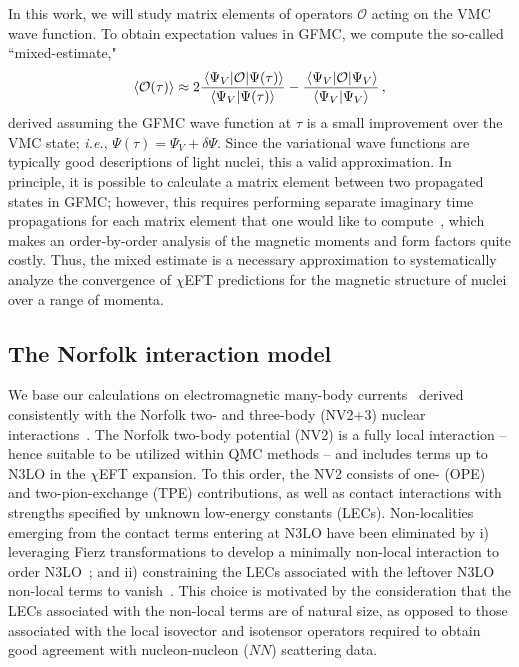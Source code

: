\documentclass[aps,prc,floatfix,showpacs,twocolumn, preprintnumbers]{revtex4-2}
\newcommand{\beq}{\begin{equation}}
\newcommand{\eeq}{\end{equation}}
\newcommand{\inner}[2]{\langle #1 | #2 \rangle}
\newcommand{\avg}[1]{\langle #1 \rangle}
\def\beq{\begin{equation}}
\def\eeq{\end{equation}}
\begin{document}
In this work, we will study matrix elements of operators $\mathcal{O}$ acting on the VMC wave function. To obtain expectation values in GFMC, we compute the so-called ``mixed-estimate,"
\beq
\avg{\mathcal{O}(\tau)} \approx 2\frac{\mel{\Psi_V}{\mathcal{O}}{\Psi(\tau)}}{\inner{\Psi_V}{\Psi(\tau)}}
- \frac{\mel{\Psi_V}{\mathcal{O}}{\Psi_V}}{\inner{\Psi_V}{\Psi_V}}\, ,
\eeq
 derived assuming the GFMC wave function at $\tau$ is a small improvement over the VMC state; {\it i.e.}, $\Psi(\tau)=\Psi_V+\delta\Psi$. 
Since the variational wave functions are typically good descriptions of light nuclei, this a valid approximation. In principle, it is possible to calculate a matrix element between two propagated states in GFMC; however, this requires performing separate imaginary time propagations for each matrix element that one would like to compute~\cite{Pervin:2007sc}, which makes an order-by-order analysis of the magnetic moments and form factors quite costly. Thus, the mixed estimate is a necessary approximation to systematically analyze the convergence of $\chi$EFT predictions for the magnetic structure of nuclei over a range of momenta. 


\subsection{The Norfolk interaction model}
\label{sec:nv23}

We base our calculations on electromagnetic many-body currents~\cite{Pastore:2008ui,Pastore:2009is,Schiavilla:2018udt,Gnech:2022vwr} derived consistently with the Norfolk two- and three-body (NV2+3) nuclear interactions~\cite{Piarulli:2014bda,Piarulli:2016vel,Piarulli:2017dwd,Baroni:2018fdn,Piarulli:2019cqu}. The Norfolk two-body potential (NV2) is a fully local interaction -- hence suitable to be utilized within QMC methods -- and includes terms up to N3LO in the $\chi$EFT expansion. To this order, the NV2 consists of  one- (OPE) and two-pion-exchange (TPE) contributions, as well as contact interactions with strengths specified by unknown low-energy constants (LECs). Non-localities emerging from the contact terms entering at N3LO have been eliminated by i) leveraging Fierz transformations to develop a minimally non-local interaction to order N3LO~\cite{Piarulli:2014bda}; and ii) constraining the LECs associated with the leftover N3LO non-local terms to vanish~\cite{Piarulli:2016vel}. This choice is motivated by the consideration that the LECs associated with the non-local terms are of natural size, as opposed to those associated with the local isovector and isotensor operators required to  obtain good agreement with nucleon-nucleon ($N\!N$) scattering data. 
\end{document}

